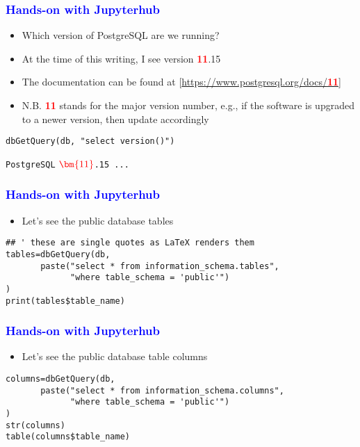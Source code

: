 \documentclass[11pt,pdftex,dvipsnames,usenames]{beamer}
\begin{document}
\begin{frame}[fragile]\frametitle{\bf\textcolor{blue}{Hands-on with Jupyterhub}}
\begin{itemize}
\item Which version of PostgreSQL are we running?
\item At the time of this writing, I see version \textbf{\textcolor{red}{11}}.15
\item The documentation can be found at
\textcolor{PineGreen}{[\href{https://www.postgresql.org/docs/11}
{https://www.postgresql.org/docs/\textbf{\textcolor{red}{11}}}]}
\item N.B. \textbf{\textcolor{red}{11}} stands for the major version number, e.g.,
if the software is upgraded to a newer version, then update accordingly
\end{itemize}
\begin{verbatim}
dbGetQuery(db, "select version()")
\end{verbatim}
\texttt{PostgreSQL} $\textcolor{red}{\bm{11}}$\texttt{.15 ...}
\end{frame}

\begin{frame}[fragile]\frametitle{\bf\textcolor{blue}{Hands-on with Jupyterhub}}
\begin{itemize}
\item Let's see the public database tables
\end{itemize}
\begin{verbatim}
## ' these are single quotes as LaTeX renders them
tables=dbGetQuery(db, 
       paste("select * from information_schema.tables",
             "where table_schema = 'public'")
)
print(tables$table_name)
\end{verbatim}
\end{frame}

\begin{frame}[fragile]\frametitle{\bf\textcolor{blue}{Hands-on with Jupyterhub}}
\begin{itemize}
\item Let's see the public database table columns
\end{itemize}
\begin{verbatim}
columns=dbGetQuery(db, 
       paste("select * from information_schema.columns",
             "where table_schema = 'public'")
)
str(columns)
table(columns$table_name)
\end{verbatim}
\end{frame}
\end{document}
